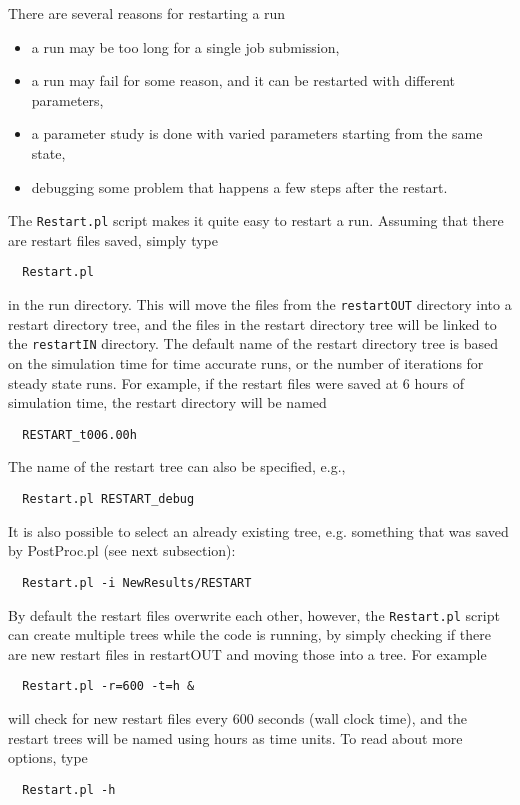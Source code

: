 There are several reasons for restarting a run
\begin{itemize}
\item a run may be too long for a single job submission,
\item a run may fail for some reason, and it can be restarted with different parameters,
\item a parameter study is done with varied parameters starting from the same state,
\item debugging some problem that happens a few steps after the restart.
\end{itemize}
The {\tt Restart.pl} script makes it quite easy to restart a run. Assuming that there are
restart files saved, simply type
\begin{verbatim}
  Restart.pl
\end{verbatim}
in the run directory. This will move the files from the {\tt restartOUT}
directory into a restart directory tree, and the files in the restart
directory tree will be linked to the {\tt restartIN} directory.
The default name of the restart directory tree is based on the simulation time
for time accurate runs, or the number of iterations for steady state runs. 
For example, if the restart files 
were saved at 6 hours of simulation time, the restart directory will be named
\begin{verbatim}
  RESTART_t006.00h
\end{verbatim}
The name of the restart tree can also be specified, e.g., 
\begin{verbatim}
  Restart.pl RESTART_debug
\end{verbatim}
It is also possible to select an already existing tree, e.g. 
something that was saved by PostProc.pl (see next subsection):
\begin{verbatim}
  Restart.pl -i NewResults/RESTART
\end{verbatim}
By default the restart files overwrite each other, however, 
the {\tt Restart.pl} script can create multiple 
trees while the code is running, by simply checking if there 
are new restart files in restartOUT and moving those into 
a tree. For example
\begin{verbatim}
  Restart.pl -r=600 -t=h &
\end{verbatim}
will check for new restart files every 600 seconds (wall clock time), 
and the restart trees will be named using hours as time units.
To read about more options, type
\begin{verbatim}
  Restart.pl -h
\end{verbatim}

